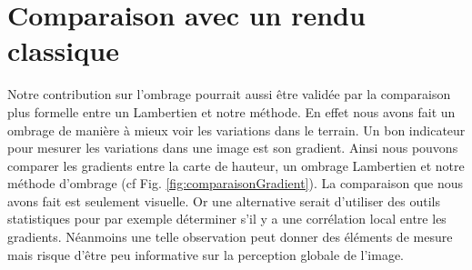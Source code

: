 \section{Comparaison avec un rendu classique}
Notre contribution sur l'ombrage pourrait aussi être validée par la comparaison plus formelle entre un Lambertien et notre méthode. En effet nous avons fait un ombrage de manière à mieux voir les variations dans le terrain. Un bon indicateur pour mesurer les variations dans une image est son gradient. Ainsi nous pouvons comparer les gradients entre la carte de hauteur, un ombrage Lambertien et notre méthode d'ombrage (cf Fig. \ref{fig:comparaisonGradient}). La comparaison que nous avons fait est seulement visuelle. Or une alternative serait d'utiliser des outils statistiques pour par exemple déterminer s'il y a une corrélation local entre les gradients. Néanmoins une telle observation peut donner des éléments de mesure mais risque d'être peu informative sur la perception globale de l'image.
